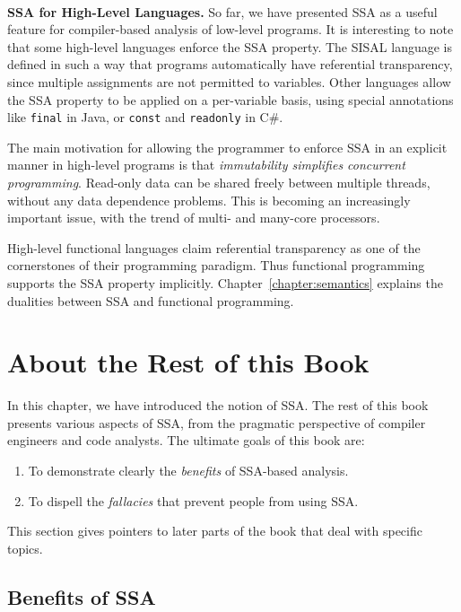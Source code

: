 ~\\ \textbf{SSA for High-Level Languages.} 
So far, we have presented SSA as a useful feature for compiler-based analysis of low-level programs. 
It is interesting to note that some high-level languages enforce the SSA property. 
The SISAL language is defined in such a way that programs automatically have referential transparency, since multiple assignments are not permitted to variables. 
Other languages allow the SSA property to be applied on a per-variable basis, using special annotations like \texttt{final} in Java, or \texttt{const} and \texttt{readonly} in C\#.

The main motivation for allowing the programmer to enforce SSA in an explicit manner in high-level programs is that \textit{immutability simplifies concurrent programming}. 
Read-only data can be shared freely between multiple threads, without any data dependence problems. 
This is becoming an increasingly important issue, with the trend of multi- and many-core processors.

High-level functional languages claim referential transparency as one of the cornerstones of their programming paradigm. 
Thus functional programming supports the SSA property implicitly. 
Chapter~\ref{chapter:semantics} explains the dualities between SSA and functional programming.



\section{About the Rest of this Book}

In this chapter, we have introduced the notion of SSA. 
The rest of this book presents various aspects of SSA, from the pragmatic perspective of compiler engineers and code analysts. 
The ultimate goals of this book are:
\begin{enumerate}
\item To demonstrate clearly the \emph{benefits} of SSA-based analysis.
\item To dispell the \emph{fallacies} that prevent people from using SSA.
\end{enumerate}
This section gives pointers to later parts of the book that deal with specific topics.


\subsection{Benefits of SSA}
\vspace{-1mm}

